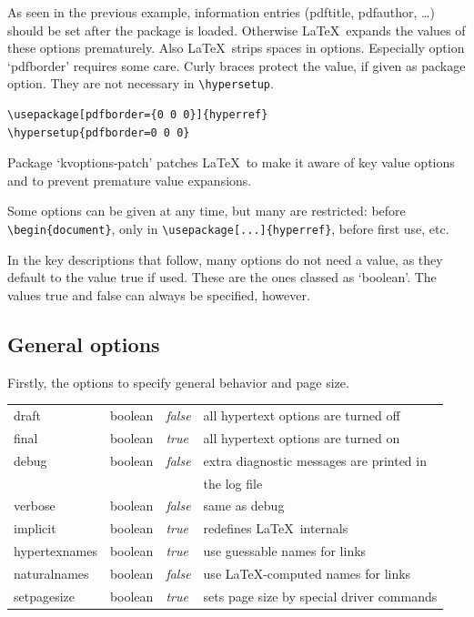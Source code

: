 \documentclass[pdftex]{article}
\begin{document}
As seen in the previous example, information entries
(pdftitle, pdfauthor, \dots) should be set after the package is loaded.
Otherwise \LaTeX\ expands the values of these options prematurely.
Also \LaTeX\ strips spaces in options. Especially option `pdfborder'
requires some care. Curly braces protect the value, if given
as package option. They are not necessary in \verb|\hypersetup|.

\begin{verbatim}
\usepackage[pdfborder={0 0 0}]{hyperref}
\hypersetup{pdfborder=0 0 0}
\end{verbatim}

Package `kvoptions-patch' patches \LaTeX\ to make it aware
of key value options and to prevent premature value expansions.

Some options can be given at any time, but many are restricted: before
\verb|\begin{document}|, only in \verb|\usepackage[...]{hyperref}|,
before first use, etc.

In the key descriptions that follow, many options do not need a value,
as they default to the value true if used. These are the ones classed as
`boolean'. The values true and false can always be specified, however.

\subsection{General options}

Firstly, the options to specify general behavior and page size.

\medskip
\noindent\begin{longtable}{>{\ttfamily}ll>{\itshape}ll}
draft          & boolean & false & all hypertext options are turned off \\
final          & boolean & true  & all hypertext options are turned on \\
debug          & boolean & false & extra diagnostic messages are printed in \\
               &         &       & the log file \\
verbose        & boolean & false & same as debug \\
implicit       & boolean & true  & redefines \LaTeX\ internals \\
hypertexnames  & boolean & true  & use guessable names for links \\
naturalnames   & boolean & false & use \LaTeX-computed names for links \\
setpagesize    & boolean & true  & sets page size by special driver commands
\end{longtable}
\end{document}
